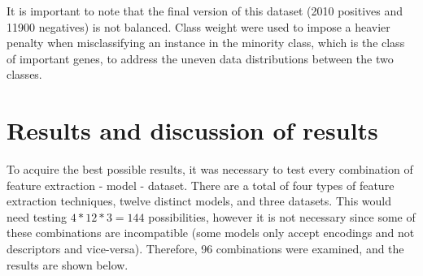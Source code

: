 It is important to note that the final version of this dataset (2010 positives and 11900 negatives) is not balanced. Class weight were used to impose a heavier penalty when misclassifying an instance in the minority class, which is the class of important genes, to address the uneven data distributions between the two classes.

\section{Results and discussion of results}

To acquire the best possible results, it was necessary to test every combination of feature extraction - model - dataset. There are a total of four types of feature extraction techniques, twelve distinct models, and three datasets. This would need testing $4*12*3 = 144$ possibilities, however it is not necessary since some of these combinations are incompatible (some models only accept encodings and not descriptors and vice-versa). Therefore, 96 combinations were examined, and the results are shown below.

